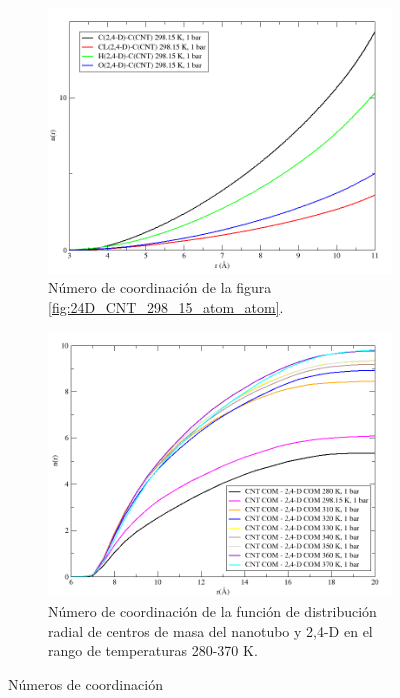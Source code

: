 \begin{figure}[!ht]
\begin{subfigure}{.5\textwidth}
  \centering
  \includegraphics[width=1\linewidth]{resultados/gr_24D_CNT_298_15_atom_atom_cn_alt.png}  
  \caption{Número de coordinación de la figura \ref{fig:24D_CNT_298_15_atom_atom}.}
  \label{fig:24D_CNT_298_15_atom_atom_cn}
\end{subfigure}
\begin{subfigure}{.5\textwidth}
  \centering
  \includegraphics[width=1\linewidth]{resultados/cmnt_cmd_alltemp.png}  
  \caption{Número de coordinación de la función de distribución radial de centros de masa del nanotubo y 2,4-D en el rango de temperaturas 280-370 K.}
  \label{fig:24D_CNT_alltemp_CM-CM_cn}
\end{subfigure}
\caption{Números de coordinación}
\label{fig:24D_CNT_298_15_alltemp_atom_atom_cn}
\end{figure}

